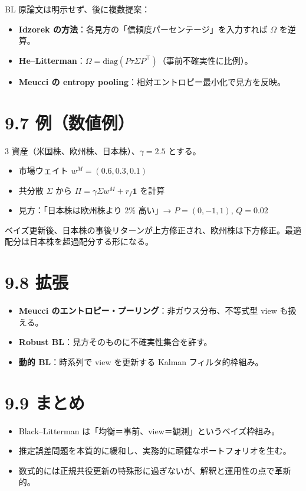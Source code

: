 \documentclass[11pt,a4paper]{report}
\begin{document}
BL 原論文は明示せず、後に複数提案：

\begin{itemize}
\item \textbf{Idzorek の方法}：各見方の「信頼度パーセンテージ」を入力すれば $\Omega$ を逆算。
\item \textbf{He–Litterman}：$\Omega = \mathrm{diag}(P \tau\Sigma P^\top)$（事前不確実性に比例）。
\item \textbf{Meucci の entropy pooling}：相対エントロピー最小化で見方を反映。
\end{itemize}

\section{9.7 例（数値例）}

3 資産（米国株、欧州株、日本株）、$\gamma = 2.5$ とする。
\begin{itemize}
\item 市場ウェイト $w^M = (0.6, 0.3, 0.1)$
\item 共分散 $\Sigma$ から $\Pi = \gamma\Sigma w^M + r_f\mathbf{1}$ を計算
\item 見方：「日本株は欧州株より 2\% 高い」→ $P = (0, -1, 1)$, $Q = 0.02$
\end{itemize}

ベイズ更新後、日本株の事後リターンが上方修正され、欧州株は下方修正。最適配分は日本株を超過配分する形になる。

\section{9.8 拡張}

\begin{itemize}
\item \textbf{Meucci のエントロピー・プーリング}：非ガウス分布、不等式型 view も扱える。
\item \textbf{Robust BL}：見方そのものに不確実性集合を許す。
\item \textbf{動的 BL}：時系列で view を更新する Kalman フィルタ的枠組み。
\end{itemize}

\section{9.9 まとめ}

\begin{itemize}
\item Black–Litterman は「均衡＝事前、view＝観測」というベイズ枠組み。
\item 推定誤差問題を本質的に緩和し、実務的に頑健なポートフォリオを生む。
\item 数式的には正規共役更新の特殊形に過ぎないが、解釈と運用性の点で革新的。
\end{itemize}
\end{document}
